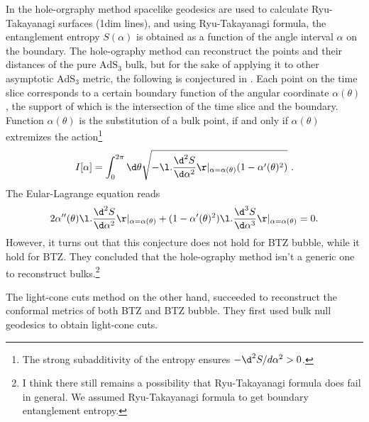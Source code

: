 \documentclass[12pt]{article}
\begin{document}
In the hole-orgraphy method spacelike geodesics are used to calculate Ryu-Takayanagi surfaces (1dim lines), and using Ryu-Takayanagi formula, the entanglement entropy $S(\alpha)$ is obtained as a function of the angle interval $\alpha$ on the boundary.
The hole-ography method can reconstruct the points and their distances of the pure $\mathrm{AdS}_3$ bulk, but for the sake of applying it to other asymptotic $\mathrm{AdS}_3$ metric, the following is conjectured in \cite{Czech:2014ppa}.
Each point on the time slice corresponds to a certain boundary function of the angular coordinate $\alpha(\theta)$, the support of which is the intersection of the time slice and the boundary.
Function $\alpha(\theta)$ is the substitution of a bulk point, if and only if $\alpha(\theta)$ extremizes the action\footnote{The strong subadditivity of the entropy ensures $-\d^2S/d\alpha^2 > 0$.}
\begin{align}
	I[\alpha] = \int_0^{2\pi}\d\theta \sqrt{-\l. \frac{\d^2S}{\d\alpha^2}\r |_{\alpha = \alpha(\theta)}(1-\alpha'(\theta)^2)}~.
\end{align}
The Eular-Lagrange equation reads
\begin{align}
	2\alpha''(\theta)\l.\frac{\d^2S}{\d\alpha^2}\r|_{\alpha = \alpha(\theta)} + (1-\alpha'(\theta)^2)\l.\frac{\d^3S}{\d\alpha^3}\r|_{\alpha = \alpha(\theta)} = 0.
\end{align}
However, it turns out that this conjecture does not hold for BTZ bubble, while it hold for BTZ.
They concluded that the hole-ography method isn't a generic one to reconstruct bulks.\footnote{I think there still remains a possibility that Ryu-Takayanagi formula does fail in general. We assumed Ryu-Takayanagi formula to get boundary entanglement entropy.}

The light-cone cuts method on the other hand, succeeded to reconstruct the conformal metrics of both BTZ and BTZ bubble.
They first used bulk null geodesics to obtain light-cone cuts.
%




 

\end{document}
